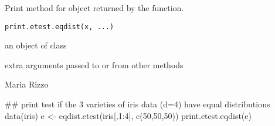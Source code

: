 \begin{Description}\relax
Print method for  object returned by the 
 function.
\end{Description}
\begin{Usage}
\begin{verbatim}
print.etest.eqdist(x, ...)
\end{verbatim}
\end{Usage}
\begin{Arguments}
\begin{ldescription}
\item[\code{x}] an object of class  
\item[\code{...}] extra arguments passed to or from other methods 
\end{ldescription}
\end{Arguments}
\begin{Author}\relax
Maria Rizzo 
\end{Author}
\begin{SeeAlso}\relax
{}
\end{SeeAlso}
\begin{Examples}
\begin{ExampleCode}
## print test if the 3 varieties of iris data (d=4) have equal distributions
 data(iris)
 e <- eqdist.etest(iris[,1:4], c(50,50,50))
 print.etest.eqdist(e)
 \end{ExampleCode}
\end{Examples}

